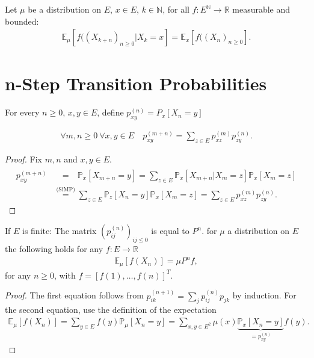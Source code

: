 \begin{cor}
Let $\mu$ be a  distribution on $E$, $x \in E$, $k \in \mathbb{N}$, for all $f: E^{\mathbb{N}} \to \mathbb{R}$ measurable and bounded:
\begin{align}
	\boxed{	\mathbb{E}_\mu \left[ f((X_{k+n})_{n \geq 0} | X_k =x \right] = \mathbb{E} _x \left[ f((X_n)_{n \geq 0} \right] } . 
\end{align}
\end{cor}

\noindent
\section{n-Step Transition Probabilities}
\begin{defn}
	For every $n\geq0$, $x, y \in E$, define $p_{xy}^{(n)}=P_x[X_n=y]$
\end{defn}

\begin{prop}
\begin{align}
	\forall m,n \geq 0 \ \forall x,y \in E \quad \boxed{ p_{xy}^{(m+n)}= \sum_{z \in E} p_{xz}^{(m)}p_{zy}^{(n)}}.
\end{align}
	
\end{prop}
\begin{proof}
Fix $m,n$ and $x,y \in E$.
	\begin{align}
		p_{xy}^{(m+n)} &\stackrel{\phantom{\textrm{(SiMP)}}}{=} 
			\mathbb{P}_{x} \left[ X_{m+n}=y \right] =
			\sum_{z \in E}^{} \mathbb{P}_{x} \left[ X_{m+n} | X_m = z \right] \mathbb{P}_{x} \left[ X_m = z \right] \\
		&\stackrel{\textrm{(SiMP)}}{=} \sum_{z \in E}^{} \mathbb{P}_{z} \left[ X_n=y \right] \mathbb{P}_{x} \left[ X_m=z \right] = \sum_{z \in E}^{} p_{xz}^{(m)} p_{zy}^{(n)}  	
	.\end{align}
	
\end{proof}


\begin{prop}[]
	If $E$ is finite:
The matrix $(p_{ij}^{(n)})_{ij \leq 0}$ is equal to $P^n$. for $\mu$ a distribution on $E$ the following holds for any $f:E \to \mathbb{R}$
	\begin{align}
	\mathbb{E}_{\mu} \left[ f(X_n) \right] = \mu P^n f
,\end{align}
for any $n\geq 0$, with $f = [f(1), \ldots ,f(n)]^T$.
\end{prop}
\begin{proof}
	The first equation follows from $p_{ik}^{(n+1)}= \sum_{j}^{} p_{ij}^{(n)}p_{jk}$ by induction. For the second equation, use the definition of the expectation
\begin{align}
	\mathbb{E}_{\mu } \left[ f(X_n) \right]  = \sum_{y \in E}^{}  f(y) \mathbb{P}_{\mu } \left[ X_n = y \right] = \sum_{x,y \in E^2}^{}  \mu (x) \underbrace{\mathbb{P}_{x} \left[ X_n =y \right]}_{=p_{xy}^{(n)}} f(y).
\end{align}
\end{proof}


